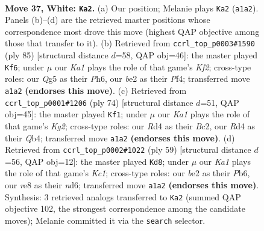 \documentclass[11pt]{article}
\begin{document}
\clearpage

\begin{figure}[p]\centering
\begin{subfigure}{0.46\textwidth}\centering
\resizebox{\linewidth}{!}{%
\newchessgame
\chessboard[
  setfen={k3r3/1p1np3/1r1p4/6Q1/3RP3/1PR2P2/4b1PP/K7 w - - 3 37},
  showmover=false,
  pgfstyle=straightmove, color=movearrow, markmove={a1-a2}
]}
\caption{}
\end{subfigure}\hfill
\begin{subfigure}{0.46\textwidth}\centering
\resizebox{\linewidth}{!}{%
\newchessgame
\chessboard[
  setfen={8/5kp1/1r5p/1P1rp3/5p1P/5PP1/1R4K1/1R6 b - - 1 43},
  showmover=false,
  pgfstyle=straightmove, color=movearrow, markmove={f7-f6}
]}
\caption{}
\end{subfigure}
\\[4pt]
\begin{subfigure}{0.46\textwidth}\centering
\resizebox{\linewidth}{!}{%
\newchessgame
\chessboard[
  setfen={8/1p4k1/p1p2r2/P3r1n1/1Q2p1b1/2P5/1PBR1PK1/8 w - - 6 38},
  showmover=false,
  pgfstyle=straightmove, color=movearrow, markmove={g2-f1}
]}
\caption{}
\end{subfigure}\hfill
\begin{subfigure}{0.46\textwidth}\centering
\resizebox{\linewidth}{!}{%
\newchessgame
\chessboard[
  setfen={2k5/p5rp/1p1N1R2/2p1n3/2P5/1P5P/r5P1/6RK b - - 1 30},
  showmover=false,
  pgfstyle=straightmove, color=movearrow, markmove={c8-d8}
]}
\caption{}
\end{subfigure}
\caption{\textbf{Move 37, White: \texttt{Ka2}.} (a) Our position; Melanie plays \texttt{Ka2} (\texttt{a1a2}). Panels (b)--(d) are the retrieved master positions whose correspondence most drove this move (highest QAP objective among those that transfer to it). (b) Retrieved from \texttt{ccrl\_top\_p0003\#1590} (ply 85) [structural distance $d$=58, QAP obj=46]: the master played \texttt{Kf6}; under $\mu$ our \emph{Ka1} plays the role of that game's \emph{Kf2}; cross-type roles: our \emph{Q}g5 as their \emph{P}h6, our \emph{b}e2 as their \emph{P}f4; transferred move \texttt{a1a2} \textbf{(endorses this move)}. (c) Retrieved from \texttt{ccrl\_top\_p0001\#1206} (ply 74) [structural distance $d$=51, QAP obj=45]: the master played \texttt{Kf1}; under $\mu$ our \emph{Ka1} plays the role of that game's \emph{Kg2}; cross-type roles: our \emph{R}d4 as their \emph{B}c2, our \emph{R}d4 as their \emph{Q}b4; transferred move \texttt{a1a2} \textbf{(endorses this move)}. (d) Retrieved from \texttt{ccrl\_top\_p0002\#1022} (ply 59) [structural distance $d$=56, QAP obj=12]: the master played \texttt{Kd8}; under $\mu$ our \emph{Ka1} plays the role of that game's \emph{Kc1}; cross-type roles: our \emph{b}e2 as their \emph{P}b6, our \emph{r}e8 as their \emph{n}d6; transferred move \texttt{a1a2} \textbf{(endorses this move)}. Synthesis: 3 retrieved analogs transferred to \texttt{Ka2} (summed QAP objective 102, the strongest correspondence among the candidate moves); Melanie committed it via the \texttt{search} selector.}
\label{fig:thought-m72}
\end{figure}
\end{document}
